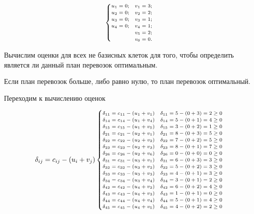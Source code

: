 $$
\scriptsize
\begin{cases}
  u_1=0;  & v_1=3;\\
  u_2=0;  & v_2=2;\\
  u_3=0;  & v_3=1;\\
  u_4=0;  & v_4=1;\\
          & v_5=2;\\
          & v_6=0.
\end{cases}
$$

Вычислим оценки для всех не базисных клеток для того, чтобы определить является ли данный план перевозок оптимальным.

Если план перевозок больше, либо равно нулю, то план  перевозок оптимальный.

Переходим к вычислению оценок

$$
\scriptsize
\delta_{ij} = c_{ij} - (u_i + v_j)
\begin{cases}
  \delta_{11} = c_{11} - (u_1 + v_1) & \delta_{11} = 5 - (0 + 3) = 2 \geq 0 \\
  \delta_{14} = c_{14} - (u_1 + v_4) & \delta_{14} = 5 - (0 + 1) = 4 \geq 0 \\
  \delta_{15} = c_{15} - (u_1 + v_5) & \delta_{15} = 3 - (0 + 2) = 1 \geq 0 \\
  \delta_{21} = c_{21} - (u_2 + v_1) & \delta_{21} = 8 - (0 + 3) = 5 \geq 0 \\
  \delta_{22} = c_{22} - (u_2 + v_2) & \delta_{22} = 7 - (0 + 2) = 5 \geq 0 \\
  \delta_{23} = c_{23} - (u_2 + v_3) & \delta_{23} = 8 - (0 + 1) = 7 \geq 0 \\
  \delta_{26} = c_{26} - (u_2 + v_6) & \delta_{26} = 0 - (0 + 0) = 0 \geq 0 \\
  \delta_{31} = c_{31} - (u_3 + v_1) & \delta_{31} = 6 - (0 + 3) = 3 \geq 0 \\
  \delta_{32} = c_{32} - (u_3 + v_2) & \delta_{32} = 5 - (0 + 2) = 3 \geq 0 \\
  \delta_{33} = c_{33} - (u_3 + v_3) & \delta_{33} = 4 - (0 + 1) = 3 \geq 0 \\
  \delta_{34} = c_{34} - (u_3 + v_4) & \delta_{34} = 3 - (0 + 1) = 2 \geq 0 \\
  \delta_{42} = c_{42} - (u_4 + v_2) & \delta_{42} = 6 - (0 + 2) = 4 \geq 0 \\
  \delta_{43} = c_{43} - (u_4 + v_3) & \delta_{43} = 1 - (0 + 1) = 0 \geq 0 \\
  \delta_{44} = c_{44} - (u_4 + v_4) & \delta_{44} = 5 - (0 + 1) = 4 \geq 0 \\
  \delta_{45} = c_{45} - (u_4 + v_5) & \delta_{45} = 4 - (0 + 2) = 2 \geq 0 \\
\end{cases}
$$

